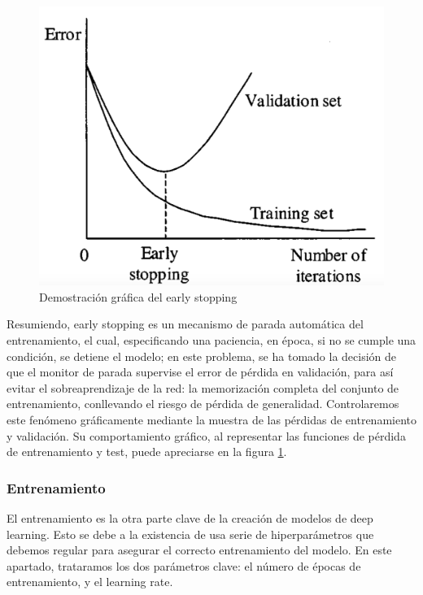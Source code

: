 \begin{figure}[H]
	\centering

	\includegraphics[scale = 0.17]{imagenes/earlystopping.png}
	\caption{Demostración gráfica del early stopping \cite{earlystop}}
		\label {earlystopping}
\end{figure}

Resumiendo, early stopping es un mecanismo de parada automática del entrenamiento, el cual, especificando una paciencia, en época, si no se cumple una condición, se detiene el modelo; en este problema, se ha tomado la decisión de que el monitor de parada supervise el error de pérdida en validación, para así evitar el sobreaprendizaje de la red: la memorización completa del conjunto de entrenamiento, conllevando el riesgo de pérdida de generalidad. Controlaremos este fenómeno gráficamente mediante la muestra de las pérdidas de entrenamiento y validación. Su comportamiento gráfico, al representar las funciones de pérdida de entrenamiento y test, puede apreciarse en la figura \ref{earlystopping}.

\subsubsection{Entrenamiento}

El entrenamiento es la otra parte clave de la creación de modelos de deep learning. Esto se debe a la existencia de usa serie de hiperparámetros que debemos regular para asegurar el correcto entrenamiento del modelo. En este apartado, trataramos los dos parámetros clave: el número de épocas de entrenamiento, y el learning rate.

